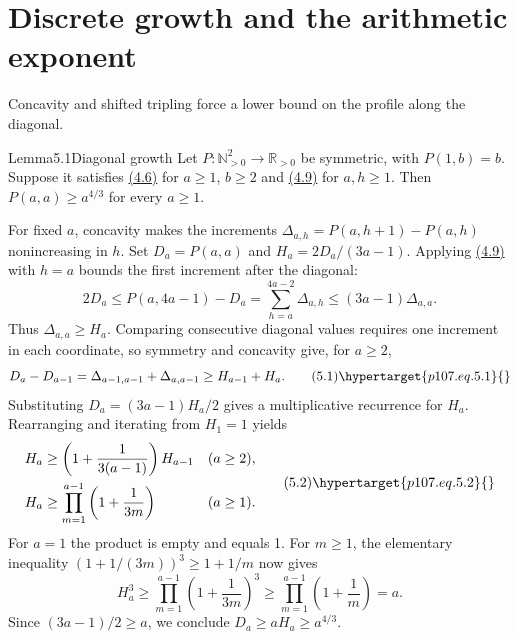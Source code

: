 \section{Discrete growth and the arithmetic exponent}\hypertarget{p107.sec.5}{}
Concavity and shifted tripling force a lower bound on the profile along the diagonal.

\begin{result}{Lemma}{5.1}{Diagonal growth}
Let $P:\mathbb N_{>0}^2\to\mathbb R_{>0}$ be symmetric, with $P(1,b)=b$. Suppose it satisfies \hyperlink{p107.eq.4.6}{(4.6)} for $a\ge1$, $b\ge2$ and \hyperlink{p107.eq.4.9}{(4.9)} for $a,h\ge1$. Then $P(a,a)\ge a^{4/3}$ for every $a\ge1$.
\end{result}
\begin{amsthmproof}
For fixed $a$, concavity makes the increments $\Delta_{a,h}=P(a,h+1)-P(a,h)$ nonincreasing in $h$. Set $D_a=P(a,a)$ and $H_a=2D_a/(3a-1)$. Applying \hyperlink{p107.eq.4.9}{(4.9)} with $h=a$ bounds the first increment after the diagonal:
\[
2D_a\le P(a,4a-1)-D_a=\sum_{h=a}^{4a-2}\Delta_{a,h}\le(3a-1)\Delta_{a,a}.
\]
Thus $\Delta_{a,a}\ge H_a$. Comparing consecutive diagonal values requires one increment in each coordinate, so symmetry and concavity give, for $a\ge2$,
\begin{equation}
D_a-D_{a-1}=\Delta_{a-1,a-1}+\Delta_{a,a-1}\ge H_{a-1}+H_a.\tag{5.1}\hypertarget{p107.eq.5.1}{}
\end{equation}
Substituting $D_a=(3a-1)H_a/2$ gives a multiplicative recurrence for $H_a$. Rearranging and iterating from $H_1=1$ yields
\begin{equation}
\begin{aligned}
H_a&\ge\left(1+\frac1{3(a-1)}\right)H_{a-1}&& (a\ge2),\\
H_a&\ge\prod_{m=1}^{a-1}\left(1+\frac1{3m}\right)&& (a\ge1).
\end{aligned}\tag{5.2}\hypertarget{p107.eq.5.2}{}
\end{equation}
For $a=1$ the product is empty and equals 1. For $m\ge1$, the elementary inequality $(1+1/(3m))^3\ge1+1/m$ now gives
\[
H_a^3\ge\prod_{m=1}^{a-1}\left(1+\frac1{3m}\right)^3\ge\prod_{m=1}^{a-1}\left(1+\frac1m\right)=a.
\]
Since $(3a-1)/2\ge a$, we conclude $D_a\ge aH_a\ge a^{4/3}$.
\end{amsthmproof}

